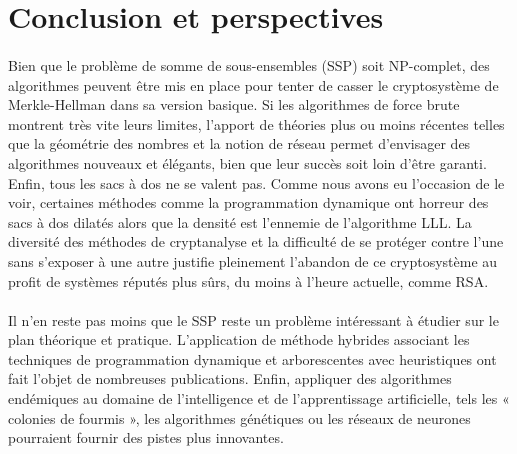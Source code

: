 \section{Conclusion et perspectives}

\paragraph{} Bien que le problème de somme de sous-ensembles (SSP) soit NP-complet, des algorithmes peuvent être mis en place pour tenter de casser le cryptosystème de Merkle-Hellman dans sa version basique. Si les algorithmes de force brute montrent très vite leurs limites, l'apport de théories plus ou moins récentes telles que la géométrie des nombres et la notion de réseau permet d'envisager des algorithmes nouveaux et élégants, bien que leur succès soit loin d'être garanti. Enfin, tous les sacs à dos ne se valent pas. Comme nous avons eu l'occasion de le voir, certaines méthodes comme la programmation dynamique ont horreur des sacs à dos dilatés alors que la densité est l'ennemie de l'algorithme LLL. La diversité des méthodes de cryptanalyse et la difficulté de se protéger contre l'une sans s'exposer à une autre justifie pleinement l'abandon de ce cryptosystème au profit de systèmes réputés plus sûrs, du moins à l'heure actuelle, comme RSA. 

\paragraph{} Il n'en reste pas moins
que le SSP reste un problème intéressant à étudier sur le plan théorique et pratique. L'application de méthode hybrides associant les techniques de programmation dynamique et arborescentes
avec heuristiques ont fait l'objet de nombreuses publications. Enfin, appliquer des algorithmes endémiques au domaine de l'intelligence et de l'apprentissage artificielle, tels les « colonies de fourmis », les algorithmes génétiques ou les réseaux de neurones  
pourraient fournir des pistes plus innovantes.